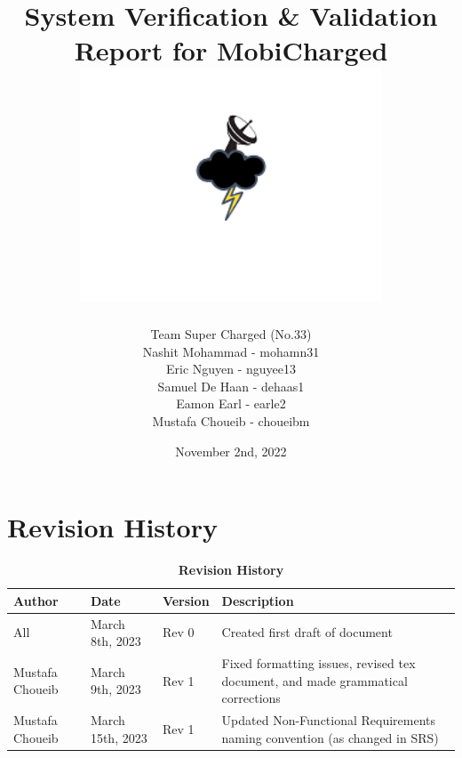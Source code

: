 \documentclass[12pt, titlepage]{article}
\begin{document}
\title{
    System Verification \& Validation Report for MobiCharged\\
    \includegraphics[width=9cm]{images/mobicharged.png} 
}
\author{Team Super Charged (No.33)
		\\ Nashit Mohammad - mohamn31
		\\ Eric Nguyen - nguyee13
		\\ Samuel De Haan - dehaas1
		\\ Eamon Earl - earle2
		\\ Mustafa Choueib - choueibm
}
    

\date{November 2nd, 2022}


\maketitle

\tableofcontents
\listoffigures
\listoftables

\vspace{20pt}


\newpage


\section{Revision History}
\begin{center}
\begin{table}[H]
\caption{\bf Revision History}
    \begin{tabular}{p{2cm}p{3cm}p{2cm}p{6cm}}
    \hline
    \bf Author & \bf Date & \bf Version & \bf Description\\
    \hline
    All & March 8th, 2023 & Rev 0 & Created first draft of document\\
    \hline
    Mustafa Choueib & March 9th, 2023 & Rev 1 & Fixed formatting issues, revised tex document, and made grammatical corrections\\
    \hline
    Mustafa Choueib & March 15th, 2023 & Rev 1 & Updated Non-Functional Requirements naming convention (as changed in SRS)\\
    \hline
    \end{tabular}
\end{table}
\end{center}
\end{document}
